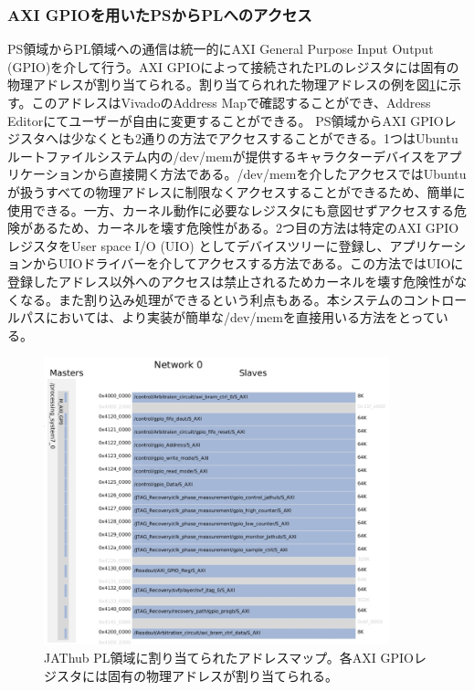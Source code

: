 \subsubsection{AXI GPIOを用いたPSからPLへのアクセス}
\label{subsubsec_axi}
\baselineskip
PS領域からPL領域への通信は統一的にAXI General Purpose Input Output (GPIO)を介して行う。AXI GPIOによって接続されたPLのレジスタには固有の物理アドレスが割り当てられる。割り当てられれた物理アドレスの例を図\ref{JATHuaddress}に示す。このアドレスはVivadoのAddress Mapで確認することができ、Address Editorにてユーザーが自由に変更することができる。
PS領域からAXI GPIOレジスタへは少なくとも2通りの方法でアクセスすることができる。1つはUbuntuルートファイルシステム内の/dev/memが提供するキャラクターデバイスをアプリケーションから直接開く方法である。/dev/memを介したアクセスではUbuntuが扱うすべての物理アドレスに制限なくアクセスすることができるため、簡単に使用できる。一方、カーネル動作に必要なレジスタにも意図せずアクセスする危険があるため、カーネルを壊す危険性がある。2つ目の方法は特定のAXI GPIOレジスタをUser space I/O (UIO) としてデバイスツリーに登録し、アプリケーションからUIOドライバーを介してアクセスする方法である。この方法ではUIOに登録したアドレス以外へのアクセスは禁止されるためカーネルを壊す危険性がなくなる。また割り込み処理ができるという利点もある。本システムのコントロールパスにおいては、より実装が簡単な/dev/memを直接用いる方法をとっている。
\baselineskip

\begin{figure} 
\centering
\includegraphics[width=10cm]{fig/QAQC/JATHubaddress.png}
\caption[アドレスマップ]{JAThub PL領域に割り当てられたアドレスマップ。各AXI GPIOレジスタには固有の物理アドレスが割り当てられる。}
\label{JATHuaddress}
\end{figure}

